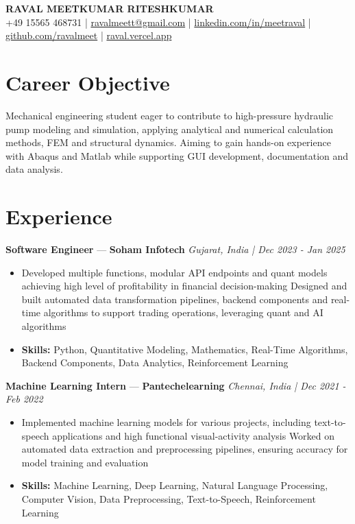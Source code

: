 \documentclass[a4paper,10pt]{article}
\begin{document}
\begin{center}
  {\Large\bfseries RAVAL MEETKUMAR RITESHKUMAR}\\[2pt]
  {\small +49 15565 468731 \;|\; \href{mailto:ravalmeett@gmail.com}{ravalmeett@gmail.com} \;|\; \href{https://www.linkedin.com/in/meetraval/}{linkedin.com/in/meetraval} \;|\; \href{https://github.com/ravalmeet}{github.com/ravalmeet} \;|\; \href{https://raval.vercel.app/}{raval.vercel.app}}
\end{center}
\vspace{-3pt}

\section*{Career Objective}
Mechanical engineering student eager to contribute to high-pressure hydraulic pump modeling and simulation, applying analytical and numerical calculation methods, FEM and structural dynamics. Aiming to gain hands-on experience with Abaqus and Matlab while supporting GUI development, documentation and data analysis.\par

\section*{Experience}
\textbf{Software Engineer} — \textbf{Soham Infotech} \hfill \textit{Gujarat, India \;|\; Dec 2023 - Jan 2025}\par
\vspace{1pt}
\begin{itemize}
  \item Developed multiple functions, modular API endpoints and quant models achieving high level of profitability in financial decision-making Designed and built automated data transformation pipelines, backend components and real-time algorithms to support trading operations, leveraging quant and AI algorithms
  \item \textbf{Skills:} Python, Quantitative Modeling, Mathematics, Real-Time Algorithms, Backend Components, Data Analytics, Reinforcement Learning
\end{itemize}
\vspace{3pt}
\textbf{Machine Learning Intern} — \textbf{Pantechelearning} \hfill \textit{Chennai, India \;|\; Dec 2021 - Feb 2022}\par
\vspace{1pt}
\begin{itemize}
  \item Implemented machine learning models for various projects, including text-to-speech applications and high functional visual-activity analysis Worked on automated data extraction and preprocessing pipelines, ensuring accuracy for model training and evaluation
  \item \textbf{Skills:} Machine Learning, Deep Learning, Natural Language Processing, Computer Vision, Data Preprocessing, Text-to-Speech, Reinforcement Learning
\end{itemize}
\end{document}
